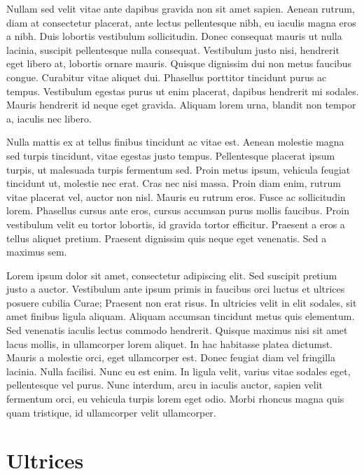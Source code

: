 Nullam sed velit vitae ante dapibus gravida non sit amet sapien. Aenean rutrum, diam at consectetur placerat, ante lectus pellentesque nibh, eu iaculis magna eros a nibh. Duis lobortis vestibulum sollicitudin. Donec consequat mauris ut nulla lacinia, suscipit pellentesque nulla consequat. Vestibulum justo nisi, hendrerit eget libero at, lobortis ornare mauris. Quisque dignissim dui non metus faucibus congue. Curabitur vitae aliquet dui. Phasellus porttitor tincidunt purus ac tempus. Vestibulum egestas purus ut enim placerat, dapibus hendrerit mi sodales. Mauris hendrerit id neque eget gravida. Aliquam lorem urna, blandit non tempor a, iaculis nec libero.

Nulla mattis ex at tellus finibus tincidunt ac vitae est. Aenean molestie magna sed turpis tincidunt, vitae egestas justo tempus. Pellentesque placerat ipsum turpis, ut malesuada turpis fermentum sed. Proin metus ipsum, vehicula feugiat tincidunt ut, molestie nec erat. Cras nec nisi massa. Proin diam enim, rutrum vitae placerat vel, auctor non nisl. Mauris eu rutrum eros. Fusce ac sollicitudin lorem. Phasellus cursus ante eros, cursus accumsan purus mollis faucibus. Proin vestibulum velit eu tortor lobortis, id gravida tortor efficitur. Praesent a eros a tellus aliquet pretium. Praesent dignissim quis neque eget venenatis. Sed a maximus sem.



Lorem ipsum dolor sit amet, consectetur adipiscing elit. Sed suscipit pretium justo a auctor. Vestibulum ante ipsum primis in faucibus orci luctus et ultrices posuere cubilia Curae; Praesent non erat risus. In ultricies velit in elit sodales, sit amet finibus ligula aliquam. Aliquam accumsan tincidunt metus quis elementum. Sed venenatis iaculis lectus commodo hendrerit. Quisque maximus nisi sit amet lacus mollis, in ullamcorper lorem aliquet. In hac habitasse platea dictumst. Mauris a molestie orci, eget ullamcorper est. Donec feugiat diam vel fringilla lacinia. Nulla facilisi. Nunc eu est enim. In ligula velit, varius vitae sodales eget, pellentesque vel purus. Nunc interdum, arcu in iaculis auctor, sapien velit fermentum orci, eu vehicula turpis lorem eget odio. Morbi rhoncus magna quis quam tristique, id ullamcorper velit ullamcorper.

\section{Ultrices}

